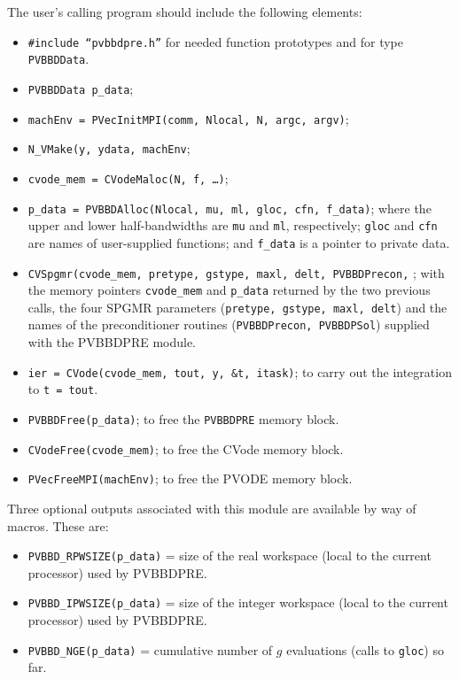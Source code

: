 The user's calling program should include the following elements:

\begin{itemize}
\item  {\tt \#include ``pvbbdpre.h''} for needed function prototypes and for
type {\tt PVBBDData}.

\item  {\tt PVBBDData p\_data};

\item  {\tt machEnv = PVecInitMPI(comm, Nlocal, N, argc, argv)};

\item  {\tt N\_VMake(y, ydata, machEnv};

\item  {\tt cvode\_mem = CVodeMaloc(N, f, \ldots )};

\item  {\tt p\_data = PVBBDAlloc(Nlocal, mu, ml, gloc, cfn, f\_data)};
where the upper and lower half-bandwidths are {\tt mu} and {\tt ml},
respectively; {\tt gloc} and {\tt cfn} are names of user-supplied
functions; and {\tt f\_data} is a pointer to private data.

\item  {\tt CVSpgmr(cvode\_mem, pretype, gstype, maxl, delt, 
PVBBDPrecon,}
; with the memory pointers 
{\tt cvode\_mem} and {\tt p\_data} returned by the two previous calls,
the four SPGMR parameters ({\tt pretype, gstype, maxl, delt}) and the
names of the preconditioner routines ({\tt PVBBDPrecon, PVBBDPSol})
supplied with the PVBBDPRE module.

\item  {\tt ier = CVode(cvode\_mem, tout, y, \&t, itask)}; to carry out the
integration to {\tt t = tout}.

\item  {\tt PVBBDFree(p\_data)}; to free the {\tt PVBBDPRE} memory block.

\item  {\tt CVodeFree(cvode\_mem)}; to free the CVode memory block.

\item  {\tt PVecFreeMPI(machEnv)}; to free the PVODE memory block.
\end{itemize}

Three optional outputs associated with this module are available by way of
macros. These are:

\begin{itemize}
\item  {\tt PVBBD\_RPWSIZE(p\_data)} = size of the real workspace (local to
the current processor) used by PVBBDPRE.

\item  {\tt PVBBD\_IPWSIZE(p\_data)} = size of the integer workspace (local to
the current processor) used by PVBBDPRE.

\item  {\tt PVBBD\_NGE(p\_data)} = cumulative number of $g$ evaluations (calls
to {\tt gloc}) so far.
\end{itemize}

